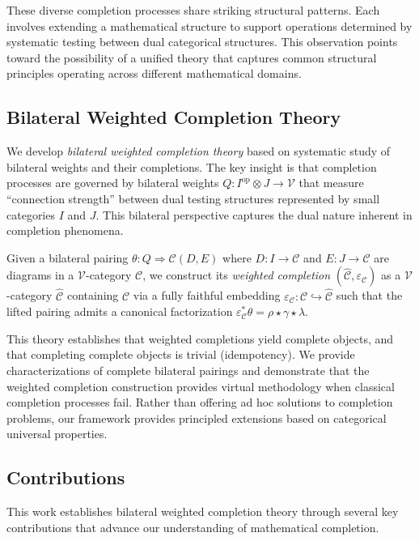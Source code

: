 \documentclass[11pt]{article}
\theoremstyle{plain}
\theoremstyle{definition}
\theoremstyle{remark}
\newcommand{\V}{\mathcal{V}}
\newcommand{\C}{\mathcal{C}}
\newcommand{\op}{\mathrm{op}}
\begin{document}
These diverse completion processes share striking structural patterns. Each involves extending a mathematical structure to support operations determined by systematic testing between dual categorical structures. This observation points toward the possibility of a unified theory that captures common structural principles operating across different mathematical domains.

\subsection{Bilateral Weighted Completion Theory}

We develop \emph{bilateral weighted completion theory} based on systematic study of bilateral weights and their completions. The key insight is that completion processes are governed by bilateral weights $Q : I^{\op} \otimes J \to \V$ that measure ``connection strength'' between dual testing structures represented by small categories $I$ and $J$. This bilateral perspective captures the dual nature inherent in completion phenomena.

Given a bilateral pairing $\theta : Q \Rightarrow \C(D,E)$ where $D : I \to \C$ and $E : J \to \C$ are diagrams in a $\V$-category $\C$, we construct its \emph{weighted completion} $(\widehat{\C}, \varepsilon_\C)$ as a $\V$-category $\widehat{\C}$ containing $\C$ via a fully faithful embedding $\varepsilon_\C : \C \hookrightarrow \widehat{\C}$ such that the lifted pairing admits a canonical factorization $\varepsilon_\C^* \theta = \rho \star \gamma \star \lambda$.

This theory establishes that weighted completions yield complete objects, and that completing complete objects is trivial (idempotency). We provide characterizations of complete bilateral pairings and demonstrate that the weighted completion construction provides virtual methodology when classical completion processes fail. Rather than offering ad hoc solutions to completion problems, our framework provides principled extensions based on categorical universal properties.

\subsection{Contributions}

This work establishes bilateral weighted completion theory through several key contributions that advance our understanding of mathematical completion.
\end{document}
